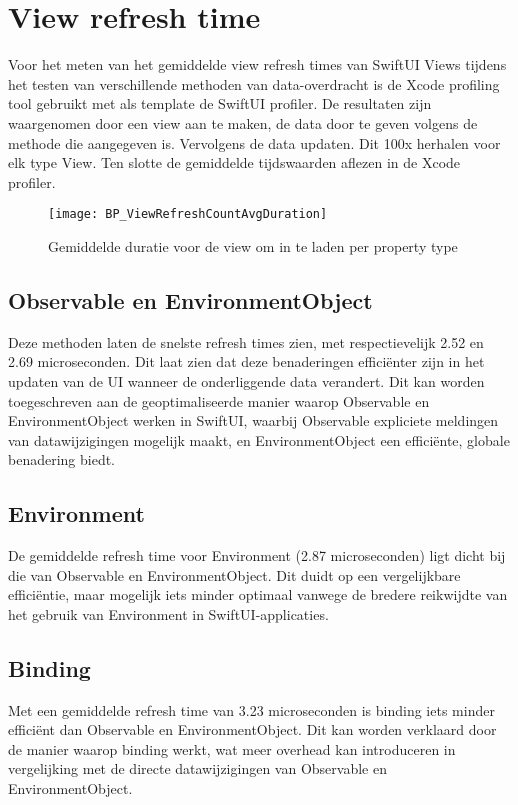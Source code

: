 \newpage
\section{View refresh time}
Voor het meten van het gemiddelde view refresh times van SwiftUI Views tijdens het testen van verschillende methoden van data-overdracht is de Xcode profiling tool gebruikt met als template de SwiftUI profiler. De resultaten zijn waargenomen door een view aan te maken, de data door te geven volgens de methode die aangegeven is. Vervolgens de data updaten. Dit 100x herhalen voor elk type View. Ten slotte de gemiddelde tijdswaarden aflezen in de Xcode profiler.

\begin{figure}[htbp]
    \centering
    \texttt{[image: BP\_ViewRefreshCountAvgDuration]} 
    \caption{Gemiddelde duratie voor de view om in te laden per property type}
    \label{fig:propertyRefreshDuration}
\end{figure}

\subsection{Observable en EnvironmentObject}
Deze methoden laten de snelste refresh times zien, met respectievelijk 2.52 en 2.69 microseconden. Dit laat zien dat deze benaderingen efficiënter zijn in het updaten van de UI wanneer de onderliggende data verandert. Dit kan worden toegeschreven aan de geoptimaliseerde manier waarop Observable en EnvironmentObject werken in SwiftUI, waarbij Observable expliciete meldingen van datawijzigingen mogelijk maakt, en EnvironmentObject een efficiënte, globale benadering biedt.

\subsection{Environment}
De gemiddelde refresh time voor Environment (2.87 microseconden) ligt dicht bij die van Observable en EnvironmentObject. Dit duidt op een vergelijkbare efficiëntie, maar mogelijk iets minder optimaal vanwege de bredere reikwijdte van het gebruik van Environment in SwiftUI-applicaties.

\subsection{Binding}
Met een gemiddelde refresh time van 3.23 microseconden is binding iets minder efficiënt dan Observable en EnvironmentObject. Dit kan worden verklaard door de manier waarop binding werkt, wat meer overhead kan introduceren in vergelijking met de directe datawijzigingen van Observable en EnvironmentObject.

